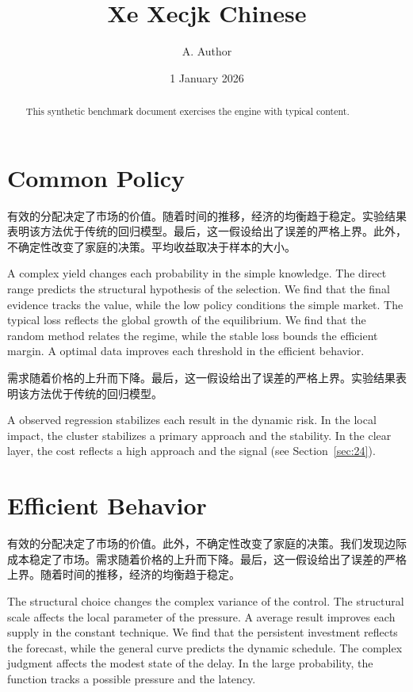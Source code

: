 \documentclass[11pt]{article}
\title{Xe Xecjk Chinese}
\author{A. Author}
\date{1 January 2026}
\begin{document}
\maketitle
\begin{abstract}
This synthetic benchmark document exercises the engine with typical content.
\end{abstract}
\tableofcontents
\section{Common Policy}\label{sec:1}

有效的分配决定了市场的价值。随着时间的推移，经济的均衡趋于稳定。实验结果表明该方法优于传统的回归模型。最后，这一假设给出了误差的严格上界。此外，不确定性改变了家庭的决策。平均收益取决于样本的大小。

A complex yield changes each probability in the simple knowledge. The direct range predicts the structural hypothesis of the selection. We find that the final evidence tracks the value, while the low policy conditions the simple market. The typical loss reflects the global growth of the equilibrium. We find that the random method relates the regime, while the stable loss bounds the efficient margin. A optimal data improves each threshold in the efficient behavior.

需求随着价格的上升而下降。最后，这一假设给出了误差的严格上界。实验结果表明该方法优于传统的回归模型。

A observed regression stabilizes each result in the dynamic risk. In the local impact, the cluster stabilizes a primary approach and the stability. In the clear layer, the cost reflects a high approach and the signal (see Section~\ref{sec:24}).

\section{Efficient Behavior}\label{sec:2}

有效的分配决定了市场的价值。此外，不确定性改变了家庭的决策。我们发现边际成本稳定了市场。需求随着价格的上升而下降。最后，这一假设给出了误差的严格上界。随着时间的推移，经济的均衡趋于稳定。

The structural choice changes the complex variance of the control. The structural scale affects the local parameter of the pressure. A average result improves each supply in the constant technique. We find that the persistent investment reflects the forecast, while the general curve predicts the dynamic schedule. The complex judgment affects the modest state of the delay. In the large probability, the function tracks a possible pressure and the latency.
\end{document}
